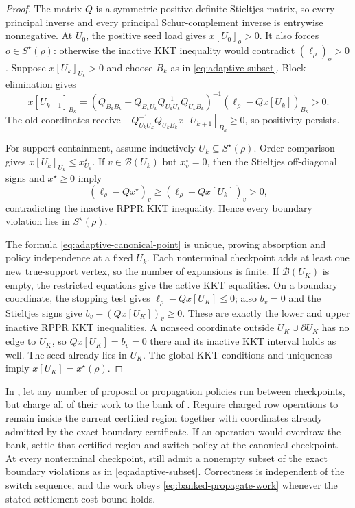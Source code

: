 \begin{proof}
The matrix $Q$ is a symmetric positive-definite Stieltjes matrix, so every
principal inverse and every principal Schur-complement inverse is
entrywise nonnegative.  At $U_0$, the positive seed load gives
$x[U_0]_o>0$.  It also forces $o\in S^\star(\rho)$: otherwise the inactive
KKT inequality would contradict $(\ell_\rho)_o>0$.  Suppose
$x[U_k]_{U_k}>0$ and choose
$B_k$ as in \eqref{eq:adaptive-subset}.  Block elimination gives
\begin{equation}
 x[U_{k+1}]_{B_k}
 =
 \left(
  Q_{B_kB_k}
  -Q_{B_kU_k}Q_{U_kU_k}^{-1}Q_{U_kB_k}
 \right)^{-1}
 (\ell_\rho-Qx[U_k])_{B_k}>0.
 \label{eq:adaptive-schur-positive}
\end{equation}
The old coordinates receive
$-Q_{U_kU_k}^{-1}Q_{U_kB_k}x[U_{k+1}]_{B_k}\geq0$, so positivity persists.

For support containment, assume inductively $U_k\subseteq S^\star(\rho)$.
Order comparison gives
$x[U_k]_{U_k}\leq x^\star_{U_k}$.  If
$v\in\mathcal B(U_k)$ but $x_v^\star=0$, then the Stieltjes off-diagonal
signs and $x^\star\geq0$ imply
\[
 (\ell_\rho-Qx^\star)_v
 \geq(\ell_\rho-Qx[U_k])_v>0,
\]
contradicting the inactive RPPR KKT inequality.  Hence every boundary
violation lies in $S^\star(\rho)$.

The formula \eqref{eq:adaptive-canonical-point} is unique, proving absorption
and policy independence at a fixed $U_k$.  Each nonterminal checkpoint adds
at least one new true-support vertex, so the number of expansions is finite.
If $\mathcal B(U_K)$ is empty, the restricted equations give the active KKT
equalities.  On a boundary coordinate, the stopping test gives
$\ell_\rho-Qx[U_K]\leq0$; also $b_v=0$ and the Stieltjes signs give
$b_v-(Qx[U_K])_v\geq0$.  These are exactly the lower and upper inactive RPPR
KKT inequalities.  A nonseed coordinate outside
$U_K\cup\partial U_K$ has no edge to $U_K$, so $Qx[U_K]=b_v=0$ there and its
inactive KKT interval holds as well.  The seed already lies in $U_K$.
The global KKT conditions and uniqueness imply
$x[U_K]=x^\star(\rho)$.
\end{proof}

\begin{corollary}
\label{cor:no-reset-switching}
In , let any number of proposal or
propagation policies run between checkpoints, but charge all of their work
to the bank of .  Require charged row operations to
remain inside the current certified region together with coordinates already
admitted by the exact boundary certificate.  If an operation would overdraw
the bank, settle that certified region and switch policy at the canonical
checkpoint.  At every nonterminal checkpoint, still admit a nonempty subset
of the exact boundary violations as in \eqref{eq:adaptive-subset}.
Correctness is independent of the switch sequence, and the work obeys
\eqref{eq:banked-propagate-work} whenever the stated settlement-cost bound
holds.
\end{corollary}

